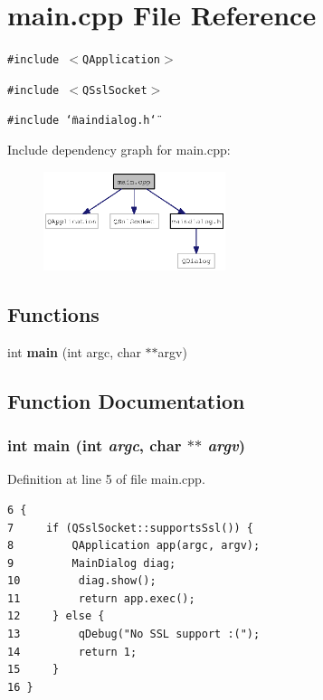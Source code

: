 \section{main.cpp File Reference}
\label{main_8cpp}
{\tt \#include $<$QApplication$>$}\par
{\tt \#include $<$QSslSocket$>$}\par
{\tt \#include \char`\"{}maindialog.h\char`\"{}}\par


Include dependency graph for main.cpp:\nopagebreak
\begin{figure}[H]
\begin{center}
\leavevmode
\includegraphics[width=151pt]{main_8cpp__incl}
\end{center}
\end{figure}
\subsection*{Functions}
\begin{CompactItemize}
\item 
int {\bf main} (int argc, char $\ast$$\ast$argv)
\end{CompactItemize}


\subsection{Function Documentation}
\subsubsection{\setlength{\rightskip}{0pt plus 5cm}int main (int {\em argc}, char $\ast$$\ast$ {\em argv})}\label{main_8cpp_3c04138a5bfe5d72780bb7e82a18e627}




Definition at line 5 of file main.cpp.

\begin{Code}\begin{verbatim}6 {
7     if (QSslSocket::supportsSsl()) {
8         QApplication app(argc, argv);
9         MainDialog diag;
10         diag.show();
11         return app.exec();
12     } else {
13         qDebug("No SSL support :(");
14         return 1;
15     }
16 }
\end{verbatim}
\end{Code}


